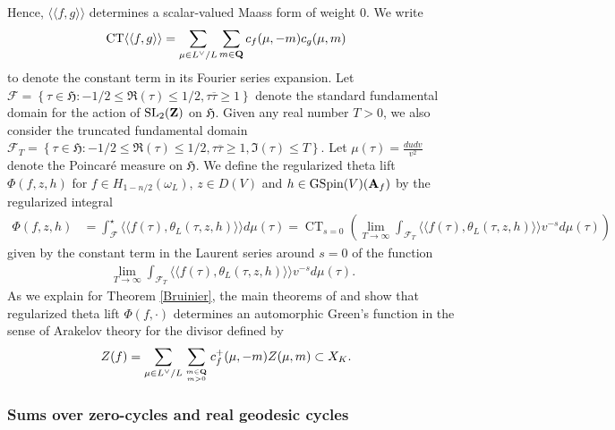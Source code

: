\documentclass{amsart}
\theoremstyle{definition}
\theoremstyle{definition}
\theoremstyle{definition}
\begin{document}
Hence, $\langle \langle f, g \rangle \rangle$ determines a scalar-valued Maass form of weight $0$. We write 
\begin{align*} \operatorname{CT} \langle \langle f, g \rangle \rangle 
&= \sum\limits_{\mu \in L^{\vee}/L} \sum\limits_{m \in {\bf{Q}} } c_f(\mu, - m) c_g(\mu, m)  \end{align*} 
to denote the constant term in its Fourier series expansion. 
Let $\mathcal{F} = \left\lbrace \tau \in \mathfrak{H}: -1/2 \leq \Re(\tau) \leq 1/2, \tau \overline{\tau} \geq 1 \right\rbrace$ 
denote the standard fundamental domain for the action of $\operatorname{SL}_2({\bf{Z}})$ on $\mathfrak{H}$. 
Given any real number $T>0$, we also consider the truncated fundamental domain
$\mathcal{F}_T = \left\lbrace \tau \in \mathfrak{H}: -1/2 \leq \Re(\tau) \leq 1/2, \tau \overline{\tau} \geq 1, \Im(\tau) \leq T \right\rbrace$.
Let $\mu(\tau) = \frac{du dv}{v^2}$ denote the Poincar\'e measure on $\mathfrak{H}$. 
We define the regularized theta lift $\Phi(f, z, h)$ for $f \in H_{1-n/2}(\omega_L)$,
$z \in D(V)$ and $h \in \operatorname{GSpin}(V)({\bf{A}}_f)$ by the regularized integral 
\begin{align*} \Phi(f, z, h) &= \int_{\mathcal{F}}^{\star} \langle \langle f(\tau), \theta_L(\tau, z, h) \rangle \rangle d \mu(\tau)
= \operatorname{CT}_{s=0} \left( \lim_{T \rightarrow \infty} \int_{\mathcal{F}_T} 
 \langle \langle f(\tau), \theta_L(\tau, z, h) \rangle \rangle v^{-s} d \mu(\tau) \right) \end{align*}
given by the constant term in the Laurent series around $s=0$ of the function
\begin{align*}  \lim_{T \rightarrow \infty} \int_{\mathcal{F}_T} 
\langle \langle f(\tau), \theta_L(\tau, z, h) \rangle \rangle v^{-s} d \mu(\tau). \end{align*}
As we explain for Theorem \ref{Bruinier}, the main theorems of \cite{Bo} and \cite{Br} show that 
regularized theta lift $\Phi(f, \cdot)$ determines an automorphic Green's function in the sense of Arakelov theory for the divisor defined by 
\begin{align*} Z(f) &= \sum\limits_{\mu \in L^{\vee}/L} \sum\limits_{m \in {\bf{Q}} \atop m >0} c_f^+(\mu, -m)Z(\mu, m) \subset X_K. \end{align*}

\subsubsection{Sums over zero-cycles and real geodesic cycles}
\end{document}
